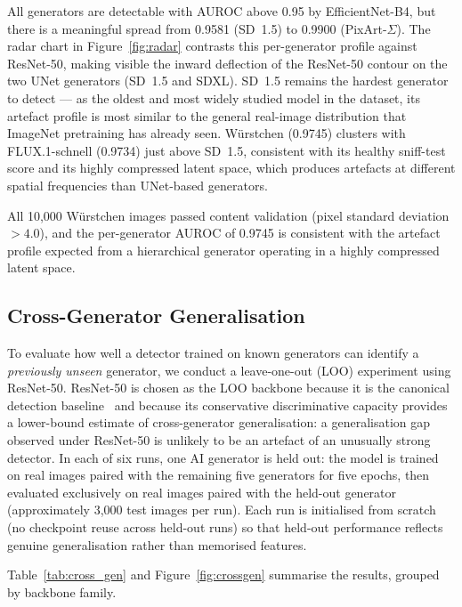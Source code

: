 All generators are detectable with AUROC above 0.95 by EfficientNet-B4,
but there is a meaningful spread from 0.9581 (SD~1.5) to 0.9900
(PixArt-$\Sigma$).
The radar chart in Figure~\ref{fig:radar} contrasts this per-generator
profile against ResNet-50, making visible the inward deflection of the
ResNet-50 contour on the two UNet generators (SD~1.5 and SDXL).
SD~1.5 remains the hardest generator to detect --- as the oldest and
most widely studied model in the dataset, its artefact profile is
most similar to the general real-image distribution that ImageNet
pretraining has already seen.
W\"{u}rstchen (0.9745) clusters with FLUX.1-schnell (0.9734) just
above SD~1.5, consistent with its healthy sniff-test score and its
highly compressed latent space, which produces artefacts at different
spatial frequencies than UNet-based generators.

All 10,000 W\"{u}rstchen images passed content validation
(pixel standard deviation $> 4.0$), and the per-generator AUROC
of 0.9745 is consistent with the artefact profile expected from
a hierarchical generator operating in a highly compressed latent space.

\subsection{Cross-Generator Generalisation}
\label{ssec:cross_gen}

To evaluate how well a detector trained on known generators can
identify a \emph{previously unseen} generator, we conduct a
leave-one-out (LOO) experiment using ResNet-50.
ResNet-50 is chosen as the LOO backbone because it is the canonical
detection baseline~\cite{wang2020cnn} and because its conservative
discriminative capacity provides a lower-bound estimate of
cross-generator generalisation: a generalisation gap observed under
ResNet-50 is unlikely to be an artefact of an unusually strong
detector.
In each of six runs, one AI generator is held out: the model is
trained on real images paired with the remaining five generators
for five epochs, then evaluated exclusively on real images paired
with the held-out generator (approximately 3{,}000 test images per
run).
Each run is initialised from scratch (no checkpoint reuse across
held-out runs) so that held-out performance reflects genuine
generalisation rather than memorised features.

Table~\ref{tab:cross_gen} and Figure~\ref{fig:crossgen} summarise the
results, grouped by backbone family.

